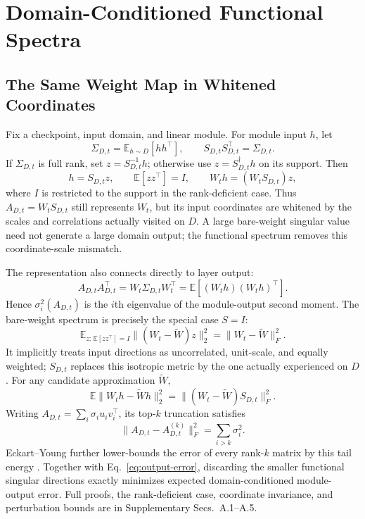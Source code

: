 \documentclass[letterpaper]{article} %
\begin{document}
\section{Domain-Conditioned Functional Spectra}

\subsection{The Same Weight Map in Whitened Coordinates}

Fix a checkpoint, input domain, and linear module. For module input $h$, let
\begin{equation}
\Sigma_{D,t}=\mathbb E_{h\sim D}[hh^\top],
\qquad
S_{D,t}S_{D,t}^{\top}=\Sigma_{D,t}.
\label{eq:second-moment}
\end{equation}
If $\Sigma_{D,t}$ is full rank, set $z=S_{D,t}^{-1}h$; otherwise use $z=S_{D,t}^{\dagger}h$ on its support. Then
\begin{equation}
h=S_{D,t}z,\qquad \mathbb E[zz^\top]=I,\qquad
W_th=(W_tS_{D,t})z,
\label{eq:whitened-map}
\end{equation}
where $I$ is restricted to the support in the rank-deficient case. Thus $A_{D,t}=W_tS_{D,t}$ still represents $W_t$, but its input coordinates are whitened by the scales and correlations actually visited on $D$. A large bare-weight singular value need not generate a large domain output; the functional spectrum removes this coordinate-scale mismatch.

The representation also connects directly to layer output:
\begin{equation}
A_{D,t}A_{D,t}^{\top}
=W_t\Sigma_{D,t}W_t^\top
=\mathbb E[(W_th)(W_th)^\top].
\label{eq:output-energy}
\end{equation}
Hence $\sigma_i^2(A_{D,t})$ is the $i$th eigenvalue of the module-output second moment.
The bare-weight spectrum is precisely the special case $S=I$:
\begin{equation}
\mathbb E_{z:\,\mathbb E[zz^\top]=I}
\|(W_t-\widetilde W)z\|_2^2
=\|W_t-\widetilde W\|_F^2.
\end{equation}
It implicitly treats input directions as uncorrelated, unit-scale, and equally weighted;
$S_{D,t}$ replaces this isotropic metric by the one actually experienced on $D$. For
any candidate approximation $\widetilde W$,
\begin{equation}
\mathbb E\|W_th-\widetilde Wh\|_2^2
=\|(W_t-\widetilde W)S_{D,t}\|_F^2.
\label{eq:output-error}
\end{equation}
Writing $A_{D,t}=\sum_i\sigma_i u_iv_i^\top$, its top-$k$ truncation satisfies
\begin{equation}
\|A_{D,t}-A_{D,t}^{(k)}\|_F^2=\sum_{i>k}\sigma_i^2.
\end{equation}
Eckart--Young further lower-bounds the error of every rank-$k$ matrix by this tail energy
\citep{eckart1936approximation}. Together with Eq.~\eqref{eq:output-error}, discarding
the smaller functional singular directions exactly minimizes expected domain-conditioned
module-output error. Full proofs, the rank-deficient case, coordinate invariance, and
perturbation bounds are in Supplementary Secs.~A.1--A.5.
\end{document}
